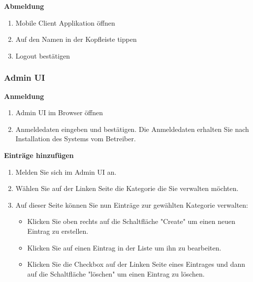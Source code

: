 \textbf{Abmeldung}

\begin{enumerate}
    \item Mobile Client Applikation öffnen
    \item Auf den Namen in der Kopfleiste tippen
    \item Logout bestätigen
\end{enumerate}

\subsubsection*{Admin UI}

\textbf{Anmeldung}

\begin{enumerate}
    \item Admin UI im Browser öffnen
    \item Anmeldedaten eingeben und bestätigen. Die Anmeldedaten erhalten Sie nach Installation des Systems vom Betreiber.
\end{enumerate}

\textbf{Einträge hinzufügen}
\begin{enumerate}
    \item Melden Sie sich im Admin UI an.
    \item Wählen Sie auf der Linken Seite die Kategorie die Sie verwalten möchten.
    \item Auf dieser Seite können Sie nun Einträge zur gewählten Kategorie verwalten:
    \begin{itemize}
        \item Klicken Sie oben rechts auf die Schaltfläche "Create" um einen neuen Eintrag zu erstellen.
        \item Klicken Sie auf einen Eintrag in der Liste um ihn zu bearbeiten.
        \item Klicken Sie die Checkbox auf der Linken Seite eines Eintrages und dann auf die Schaltfläche "löschen" um einen Eintrag zu löschen.
    \end{itemize}
\end{enumerate}

